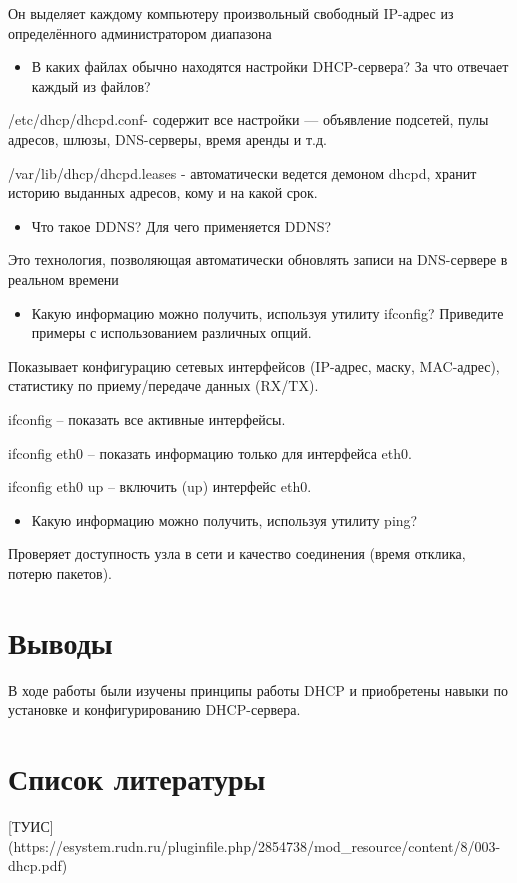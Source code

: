 \documentclass[
  english,
  russian,
  12pt,
  a4paper,
  DIV=11,
  numbers=noendperiod]{scrreprt}
\providecommand{\tightlist}{%
  \setlength{\itemsep}{0pt}\setlength{\parskip}{0pt}}
\begin{document}
Он выделяет каждому компьютеру произвольный свободный IP-адрес из
определённого администратором диапазона

\begin{itemize}
\tightlist
\item
  В каких файлах обычно находятся настройки DHCP-сервера? За что
  отвечает каждый из файлов?
\end{itemize}

/etc/dhcp/dhcpd.conf- содержит все настройки --- объявление подсетей,
пулы адресов, шлюзы, DNS-серверы, время аренды и т.д.

/var/lib/dhcp/dhcpd.leases - автоматически ведется демоном dhcpd, хранит
историю выданных адресов, кому и на какой срок.

\begin{itemize}
\tightlist
\item
  Что такое DDNS? Для чего применяется DDNS?
\end{itemize}

Это технология, позволяющая автоматически обновлять записи на
DNS-сервере в реальном времени

\begin{itemize}
\tightlist
\item
  Какую информацию можно получить, используя утилиту ifconfig? Приведите
  примеры с использованием различных опций.
\end{itemize}

Показывает конфигурацию сетевых интерфейсов (IP-адрес, маску,
MAC-адрес), статистику по приему/передаче данных (RX/TX).

ifconfig -- показать все активные интерфейсы.

ifconfig eth0 -- показать информацию только для интерфейса eth0.

ifconfig eth0 up -- включить (up) интерфейс eth0.

\begin{itemize}
\tightlist
\item
  Какую информацию можно получить, используя утилиту ping?
\end{itemize}

Проверяет доступность узла в сети и качество соединения (время отклика,
потерю пакетов).

\chapter{Выводы}\label{ux432ux44bux432ux43eux434ux44b}

В ходе работы были изучены принципы работы DHCP и приобретены навыки по
установке и конфигурированию DHCP-сервера.

\chapter*{Список
литературы}\label{ux441ux43fux438ux441ux43eux43a-ux43bux438ux442ux435ux440ux430ux442ux443ux440ux44b}

{[}ТУИС{]}
(https://esystem.rudn.ru/pluginfile.php/2854738/mod\_resource/content/8/003-dhcp.pdf)


\printbibliography
\end{document}
